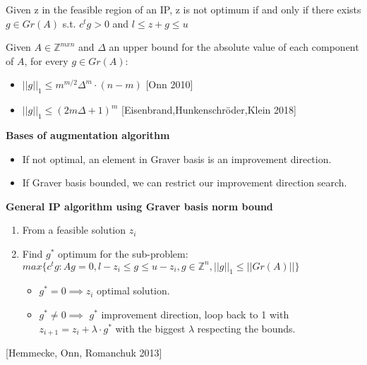 \begin{proposition}
Given z in the feasible region of an IP, z is not optimum if and only if there exists $g \in Gr(A)$ s.t. $c^tg > 0$ and $l \leq z + g \leq u$
\end{proposition}

\begin{proposition}
Given $A \in \mathbb{Z}^{mxn}$ and $\Delta$ an upper bound for the absolute value of each component of $A$, for every $g \in Gr(A)$:
\begin{itemize}
    \item $||g||_1 \leq m^{m/2}\Delta^m\cdot(n - m)$ \hspace{10pt}[Onn 2010]
    \item $||g||_1 \leq (2m \Delta + 1)^m$ \hspace{41pt}[Eisenbrand,Hunkenschröder,Klein 2018]
\end{itemize}
\end{proposition}

\textbf{Bases of augmentation algorithm}
\begin{itemize}
    \item If not optimal, an element in Graver basis is an improvement direction.
    \item If Graver basis bounded, we can restrict our improvement direction search.
\end{itemize}

\textbf{General IP algorithm using Graver basis norm bound}
\begin{enumerate}
    \item From a feasible solution $z_i$
    \item Find $g^*$ optimum for the sub-problem: \vspace{4pt}\\
          $max\{c^tg : Ag = 0, l-z_i \leq g \leq u-z_i, g \in \mathbb{Z}^n, ||g||_1 \leq ||Gr(A)|| \}$ \vspace{4pt}
    \begin{itemize}
        \item $g^* = 0 \implies z_i$ optimal solution.
        \item $g^* \neq 0 \implies$ $g^*$ improvement direction, loop back to 1 with $z_{i+1} = z_i + \lambda \cdot g^*$ with the biggest $\lambda$ respecting the bounds.
    \end{itemize}
\end{enumerate}
\hspace{15pt} [Hemmecke, Onn, Romanchuk 2013]


        
